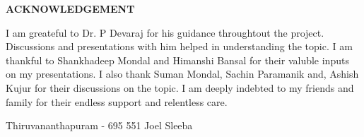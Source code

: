 \begin{center}
  {\Large{\bf{ACKNOWLEDGEMENT}}}
\end{center}

\vspace{2em}

I am greateful to Dr. P Devaraj for his guidance throughtout the project. Discussions and presentations with him helped in understanding the topic. I am thankful to Shankhadeep Mondal and Himanshi Bansal for their valuble inputs on my presentations. I also thank Suman Mondal, Sachin Paramanik and, Ashish Kujur for their discussions on the topic. I am deeply indebted to my friends and family for their endless support and relentless care.

\vspace{3em}

\noindent Thiruvananthapuram - 695 551 \hfill Joel Sleeba

